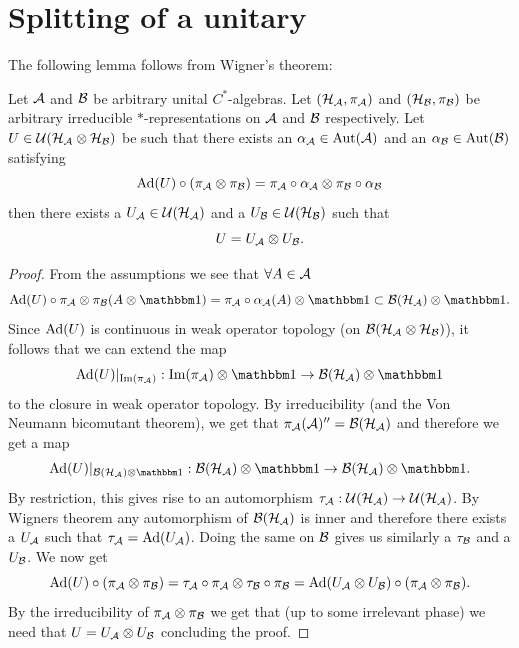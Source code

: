 \documentclass[11pt,a4paper,twoside]{article}
\numberwithin{equation}{section}
\begin{document}
	\section{Splitting of a unitary}
	The following lemma follows from Wigner's theorem:
	\begin{lemma}\label{lem:SplittingOfUnitary}
		Let $\AA$ and $\BB$ be arbitrary unital $C^*$-algebras. Let $(\HH_\AA,\pi_\AA)$ and $(\HH_\BB,\pi_\BB)$ be arbitrary irreducible $*$-representations on $\AA$ and $\BB$ respectively. Let $U\in\UU(\HH_\AA\otimes\HH_\BB)$ be such that there exists an $\alpha_\AA\in\Aut{\AA}$ and an $\alpha_\BB\in\Aut{\BB}$ satisfying
		\begin{equation}
			\Ad{U}\circ(\pi_\AA\otimes\pi_\BB)=\pi_\AA\circ\alpha_\AA\otimes\pi_\BB\circ\alpha_\BB
		\end{equation}
		then there exists a $U_\AA\in\UU(\HH_\AA)$ and a $U_\BB\in\UU(\HH_\BB)$ such that
		\begin{equation}
			U=U_\AA\otimes U_\BB.
		\end{equation}
	\end{lemma}
	\begin{proof}
		From the assumptions we see that $\forall A\in\AA$
		\begin{equation}
			\Ad{U}\circ\pi_\AA\otimes\pi_\BB(A\otimes\id)=\pi_\AA\circ\alpha_\AA(A)\otimes\id\subset \BB(\HH_\AA)\otimes\id.
		\end{equation}
		Since $\Ad{U}$ is continuous in weak operator topology (on $\BB(\HH_{\AA}\otimes\HH_{\BB})$), it follows that we can extend the map
		\begin{equation}
			\Ad{U}|_{\textrm{Im}(\pi_\AA)}:\textrm{Im}(\pi_\AA)\otimes\id\rightarrow \BB(\HH_\AA)\otimes\id
		\end{equation}
		to the closure in weak operator topology. By irreducibility (and the Von Neumann bicomutant theorem), we get that $\pi_\AA(\AA)''=\BB(\HH_\AA)$ and therefore we get a map
		\begin{equation}
			\Ad{U}|_{\BB(\HH_\AA)\otimes\id}:\BB(\HH_\AA)\otimes\id\rightarrow \BB(\HH_\AA)\otimes\id.
		\end{equation}
		By restriction, this gives rise to an automorphism $\tau_\AA:\UU(\HH_\AA)\rightarrow\UU(\HH_\AA)$. By Wigners theorem any automorphism of $\BB(\HH_\AA)$ is inner and therefore there exists a $U_\AA$ such that $\tau_\AA=\Ad{U_\AA}$. Doing the same on $\BB$ gives us similarly a $\tau_\BB$ and a $U_\BB$. We now get
		\begin{equation}
			\Ad{U}\circ(\pi_\AA\otimes\pi_\BB)=\tau_\AA\circ\pi_\AA\otimes\tau_\BB\circ\pi_\BB=\Ad{U_\AA\otimes U_\BB}\circ(\pi_\AA\otimes\pi_\BB).
		\end{equation}
		By the irreducibility of $\pi_\AA\otimes\pi_\BB$ we get that (up to some irrelevant phase) we need that $U=U_\AA\otimes U_\BB$ concluding the proof.
	\end{proof}
\end{document}
